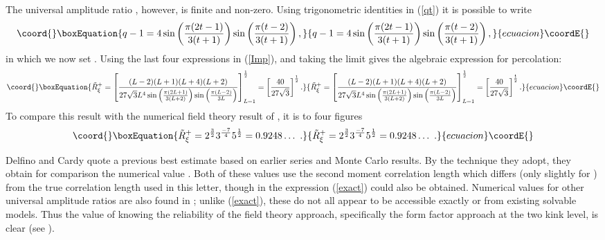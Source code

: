 \documentclass[a4paper,a4paper]{article}
\begin{document}
The universal amplitude
ratio \coordHE{}, however, is finite and non-zero. 
Using trigonometric identities in (\ref{qt}) it is possible to write
\begin{equation*}\coord{}\boxEquation{
q-1=4\sin\left(\frac{\pi(2t-1)}{3(t+1)}\right)
\sin\left(\frac{\pi(t-2)}{3(t+1)}\right),\label{rule}
}{
q-1=4\sin\left(\frac{\pi(2t-1)}{3(t+1)}\right)
\sin\left(\frac{\pi(t-2)}{3(t+1)}\right),}{ecuacion}\coordE{}\end{equation*}
in which we now set \coordHE{}.
Using the last four expressions
in (\ref{Imp}), and taking the limit \coordHE{} gives the algebraic
expression  for percolation:
\begin{equation}\coord{}\boxEquation{
\tilde{R}^{+}_{\xi}=\left[\frac{(L-2)(L+1)(L+4)(L+2)}{27 \sqrt{3}L^4
\sin\left(\frac{\pi (2L+1)}{3(L+2)}\right)\sin\left(\frac{\pi(L-2)}{3L}
\right)}
\right]^{\frac{1}{2}}_{L=1}=\left[\frac{40}{27\sqrt{3}}\right]^{\frac{1}{2}}.
\label{exact}
}{
\tilde{R}^{+}_{\xi}=\left[\frac{(L-2)(L+1)(L+4)(L+2)}{27 \sqrt{3}L^4
\sin\left(\frac{\pi (2L+1)}{3(L+2)}\right)\sin\left(\frac{\pi(L-2)}{3L}
\right)}
\right]^{\frac{1}{2}}_{L=1}=\left[\frac{40}{27\sqrt{3}}\right]^{\frac{1}{2}}.
}{ecuacion}\coordE{}\end{equation}
To compare this result with the numerical field theory result of 
\cite{dc}, it is to four figures
\begin{equation*}\coord{}\boxEquation{
\tilde{R}_{\xi}^{+}=2^{\frac{3}{2}}3^{\frac{-7}{4}}5^{\frac{1}{2}}=
0.9248\ldots\ .
}{
\tilde{R}_{\xi}^{+}=2^{\frac{3}{2}}3^{\frac{-7}{4}}5^{\frac{1}{2}}=
0.9248\ldots\ .
}{ecuacion}\coordE{}\end{equation*}

Delfino and Cardy \cite{dc} quote a previous best estimate 
\coordHE{} based on earlier series \cite{dp} and 
Monte Carlo \cite{MC}
results.  By the technique they adopt,
they obtain for comparison the numerical value \coordHE{}. 
Both of these values use the second moment correlation length
which differs (only slightly for \coordHE{}) from the true
correlation length used in this letter, though in \cite{dc}
the expression (\ref{exact}) could also be obtained. 
Numerical values for other universal amplitude 
ratios are also found in \cite{dc};
unlike (\ref{exact}),  these 
do not all appear to be accessible exactly or from existing solvable models. 
Thus the value of knowing the reliability
of the field theory approach, specifically the
form factor approach at the two kink level, is clear (see \cite{cm}).
 
\end{document}
